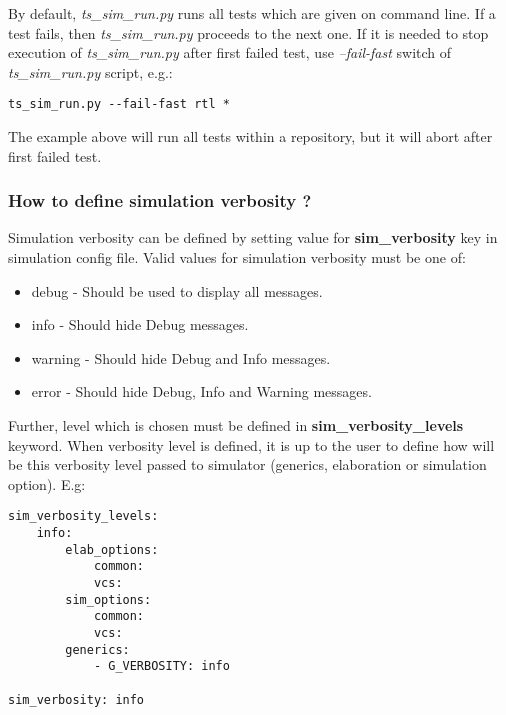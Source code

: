 \documentclass{tropic_design_spec}
\begin{document}
By default, \textit{ts_sim_run.py} runs all tests which are given on command line. If a
test fails, then \textit{ts_sim_run.py} proceeds to the next one. If it is needed to stop
execution of \textit{ts_sim_run.py} after first failed test, use \textit{--fail-fast}
switch of \textit{ts_sim_run.py} script, e.g.:

\begin{lstlisting}
ts_sim_run.py --fail-fast rtl *
\end{lstlisting}

The example above will run all tests within a repository, but it will abort after first
failed test.


\subsubsection{How to define simulation verbosity ?}
\label{sec:how-to-define-simulation-verbosity}

Simulation verbosity can be defined by setting value for \textbf{sim_verbosity} key in
simulation config file. Valid values for simulation verbosity must be one of:

\begin{itemize}
    \item{debug - Should be used to display all messages.}
    \item{info - Should hide Debug messages.}
    \item{warning - Should hide Debug and Info messages.}
    \item{error - Should hide Debug, Info and Warning messages.}
\end{itemize}

Further, level which is chosen must be defined in \textbf{sim_verbosity_levels} keyword.
When verbosity level is defined, it is up to the user to define how will be this verbosity
level passed to simulator (generics, elaboration or simulation option). E.g:

\begin{lstlisting}
sim_verbosity_levels:
    info:
        elab_options:
            common:
            vcs:
        sim_options:
            common:
            vcs:
        generics:
            - G_VERBOSITY: info

sim_verbosity: info
\end{lstlisting}
\end{document}
